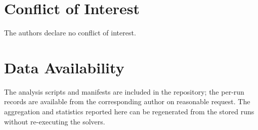 \documentclass[journal]{IEEEtran}
\begin{document}
\section*{Conflict of Interest}
The authors declare no conflict of interest.

\section*{Data Availability}
The analysis scripts and manifests are included in the repository; the per-run records are available from the corresponding author on reasonable request. The aggregation and statistics reported here can be regenerated from the stored runs without re-executing the solvers.



\end{document}
